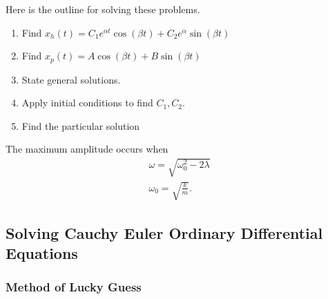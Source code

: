 \begin{theorem}
  Here is the outline for solving these problems.
  \begin{enumerate}
    \item Find $x_h(t)=C_1e^{\alpha t}\cos\left( \beta t \right) +C_2e^{\alpha}\sin\left( \beta t \right) $
    \item Find $x_p(t)=A\cos\left( \beta t \right) +B\sin\left( \beta t \right) $
    \item State general solutions.
    \item Apply initial conditions to find $C_1,C_2$.
    \item Find the particular solution
  \end{enumerate}
\end{theorem}

\begin{note}
  The maximum amplitude occurs when 
  \begin{align*}
    \omega=\sqrt{\omega_0^2-2\lambda}\\
    \omega_0=\sqrt{\frac{k}{m}} 
  .\end{align*}
\end{note}
\subsection{Solving Cauchy Euler Ordinary Differential Equations}
\subsubsection{Method of Lucky Guess}

